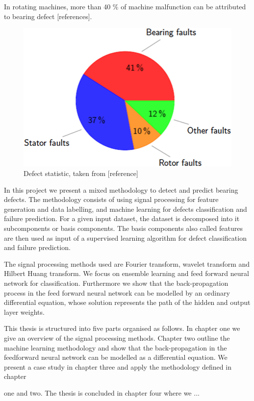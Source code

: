 \documentclass[11pt, oneside]{article}   	%
\begin{document}
\begin{flushleft}
In rotating machines, more than 40 $\%$ of machine malfunction can be attributed to bearing defect [references]. 
\end{flushleft}
\begin{figure}[H] %
   \centering
   \includegraphics[width=5in]{pie.png} 
   \caption{Defect statistic, taken from [reference]}
   \label{fig:pie}
\end{figure}
In this project we present a mixed methodology to detect and predict bearing defects. The methodology consists of using signal processing for feature generation and data labelling,  and machine learning for defects classification and failure prediction. For a given input dataset, the dataset is decomposed into it subcomponents or basis components. The basis components also called features are then used as input of a supervised learning algorithm for defect classification and failure prediction.
\begin{flushleft}
The signal processing methods used are Fourier transform, wavelet transform and Hilbert Huang transform. We focus on ensemble learning and feed forward neural network for classification. Furthermore we show that the back-propagation process in the feed forward neural network can be modelled by an ordinary differential equation, whose solution represents the path of the hidden and output layer weights.
\end{flushleft}


\begin{flushleft}
This thesis is structured into five parts organised as follows. In chapter one we give an overview of the signal processing methods. Chapter two outline the machine learning methodology and show that the back-propagation in the feedforward neural network can be modelled as a differential equation.
We present a case study in chapter three and apply the methodology defined in chapter

 one and two. The thesis is concluded in chapter four where we ...
\end{flushleft}
\end{document}
